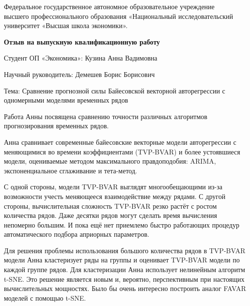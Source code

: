\documentclass[a4paper, 12pt]{article}
\begin{document}
\begin{center}
{\small Федеральное государственное автономное образовательное учреждение\\ 
высшего профессионального образования «Национальный исследовательский\\ 
университет «Высшая школа экономики».}
\end{center}

\vspace{0.4cm}

\begin{center}
\textbf{Отзыв на выпускную квалификационную работу}
\end{center}

\vspace{0.4cm}

Студент ОП «Экономика»: Кузина Анна Вадимовна

\vspace{0.4cm}

Научный руководитель: Демешев Борис Борисович

\vspace{0.4cm}

Тема: Сравнение прогнозной силы Байесовской векторной авторегрессии с
одномерными моделями временных рядов

\vspace{1cm}

Работа Анны посвящена сравнению точности различных алгоритмов
прогнозирования временных рядов.

Анна сравнивает современные байесовские векторные модели авторегрессии с
меняющимися во времени коэффициентами (TVP-BVAR) и более устоявшиеся
модели, оцениваемые методом максимального правдоподобия: ARIMA,
экспоненциальное сглаживание и тета-метод.

С одной стороны, модели TVP-BVAR выглядят многообещающими из-за
возможности учесть меняющееся взаимодействие между рядами. С другой
стороны, вычислительная сложность TVP-BVAR резко растёт с ростом
количества рядов. Даже десятки рядов могут сделать время вычисления
непомерно большим. И пока ещё нет приемлемо быстро работающих процедур
автоматического подбора априорных параметров.

Для решения проблемы использования большого количества рядов в TVP-BVAR
модели Анна кластеризует ряды на группы и оценивает TVP-BVAR модели по
каждой группе рядов. Для кластеризации Анна использует нелинейным
алгоритм t-SNE. Это решение является новым и, вероятно, перспективным
при настоящих вычислительных мощностях. Было бы очень интересно
построить аналог FAVAR моделей с помощью t-SNE.
\end{document}

